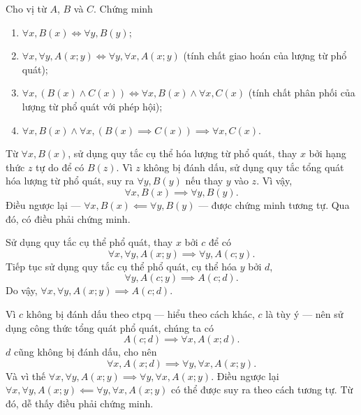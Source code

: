 \exercise Cho vị từ $A$, $B$ và $C$. Chứng minh 
\begin{enumerate}
   \item $\forall x, B(x) \iff \forall y, B(y)$;
   \item $\forall x, \forall y, A(x; y) \iff \forall y, \forall x, A(x; y)$ (tính chất giao hoán của lượng từ phổ quát);
   \item $\forall x, (B(x) \land C(x)) \iff \forall x, B(x) \land \forall x, C(x)$ (tính chất phân phối của lượng từ phổ quát với phép hội);
   \item $\forall x, B(x) \land \forall x, (B(x) \implies C(x)) \implies \forall x, C(x)$.
\end{enumerate}

\solution

\resetSubexercise Từ $\forall x, B(x)$, sử dụng quy tắc cụ thể hóa lượng từ phổ quát, thay $x$ bởi hạng thức $z$ tự do để có $B(z)$. Vì $z$ không bị đánh dấu, sử dụng quy tắc tổng quát hóa lượng từ phổ quát, suy ra $\forall y, B(y)$ nếu thay $y$ vào $z$. Vì vậy, \begin{equation*}
   \forall x, B(x) \implies \forall y, B(y).
\end{equation*}
Điều ngược lại --- $\forall x, B(x) \impliedby \forall y, B(y)$ --- được chứng minh tương tự. Qua đó, có điều phải chứng minh.

\stepSubexercise Sử dụng quy tắc cụ thể phổ quát, thay $x$ bởi $c$ để có 
\begin{equation*}
   \forall x, \forall y, A(x; y) \implies \forall y, A(c; y).
\end{equation*}
Tiếp tục sử dụng quy tắc cụ thể phổ quát, cụ thể hóa $y$ bởi $d$,
\begin{equation*}
   \forall y, A(c; y) \implies A(c; d).
\end{equation*}
Do vậy, $\forall x, \forall y, A(x; y) \implies A(c; d)$.

Vì $c$ không bị đánh dấu theo ctpq --- hiểu theo cách khác, $c$ là tùy ý --- nên sử dụng công thức tổng quát phổ quát, chúng ta có 
\begin{equation*}
   A(c; d) \implies \forall x, A(x; d).
\end{equation*}
$d$ cũng không bị đánh dấu, cho nên \begin{equation*}
   \forall x, A(x; d) \implies \forall y, \forall x, A(x; y).
\end{equation*}
Và vì thế $\forall x, \forall y, A(x; y) \implies \forall y, \forall x, A(x; y)$. Điều ngược lại $\forall x, \forall y, A(x; y) \impliedby \forall y, \forall x, A(x; y)$ có thể được suy ra theo cách tương tự. Từ đó, dễ thấy điều phải chứng minh.

